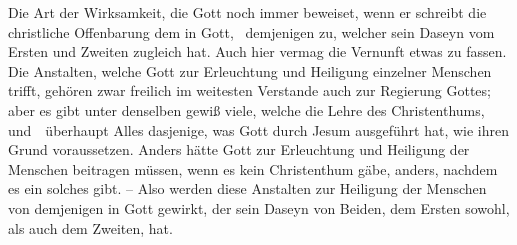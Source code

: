 \begin{aufza}
\begin{aufzb}
\item Die Art der Wirksamkeit, die Gott noch immer beweiset, wenn er  schreibt die christliche Offenbarung dem  in Gott, \dh\ demjenigen zu, welcher sein Daseyn vom Ersten und Zweiten zugleich hat. Auch hier vermag die Vernunft etwas zu fassen. Die Anstalten, welche Gott zur Erleuchtung und Heiligung einzelner Menschen trifft, gehören zwar freilich im weitesten Verstande auch zur Regierung Gottes; aber es gibt unter denselben gewiß viele, welche die Lehre des Christenthums, und~\ überhaupt Alles dasjenige, was Gott durch Jesum ausgeführt hat, wie ihren Grund voraussetzen. Anders hätte Gott zur Erleuchtung und Heiligung der Menschen beitragen müssen, wenn es kein Christenthum gäbe, anders, nachdem es ein solches gibt. -- Also werden diese Anstalten zur Heiligung der Menschen von demjenigen in Gott gewirkt, der sein Daseyn von Beiden, dem Ersten sowohl, als auch dem Zweiten, hat.
\end{aufzb}
\end{aufza}

